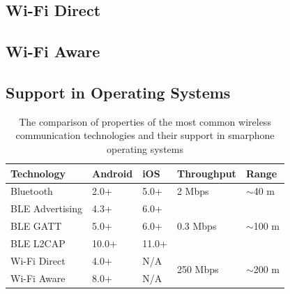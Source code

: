 
\subsection{Wi-Fi Direct}

\subsection{Wi-Fi Aware}


\subsection{Support in Operating Systems}

\begin{table}
    \centering
    \begin{tabular}{ | l | l | l | l | l | }
      \hline
      \textbf{Technology} & \textbf{Android} & \textbf{iOS} & \textbf{Throughput} & \textbf{Range} \\
      \hline
      Bluetooth & 2.0+ & 5.0+ & 2 Mbps & $\sim$40 m \\
      \hline
      BLE Advertising & 4.3+ & 6.0+ & \multirow{3}{*}{0.3 Mbps} & \multirow{3}{*}{$\sim$100 m} \\
      BLE GATT & 5.0+ & 6.0+ & &  \\
      BLE L2CAP & 10.0+ & 11.0+ & &  \\
      \hline
      Wi-Fi Direct & 4.0+ & N/A & \multirow{2}{*}{250 Mbps} & \multirow{2}{*}{$\sim$200 m} \\
      Wi-Fi Aware & 8.0+ & N/A & & \\
      \hline
    \end{tabular}
    \caption{The comparison of properties of the most common wireless communication technologies and their support in smarphone operating systems
    }
    \label{wirelesstech_table}
  \end{table}






